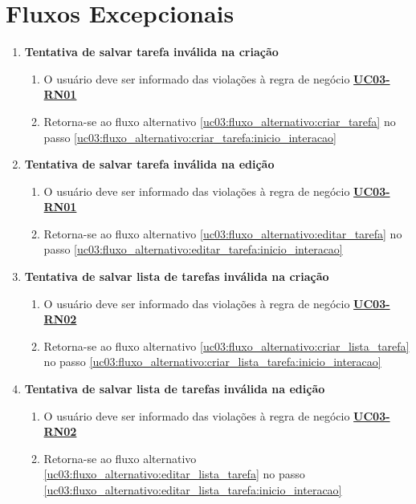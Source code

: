 \documentclass[
	12pt,				%
	oneside,			%
	a4paper,			%
	english,			%
	brazil,				%
	]{abntex2}
\begin{document}
\section{Fluxos Excepcionais}
\begin{enumerate}[label=\textbf{UC03-FE{\arabic*}},font=\normalsize]
    \item \textbf{\normalsize Tentativa de salvar tarefa inválida na criação} \label{uc03:fluxo_excepcional:tarefa_invalida_criar}
    \begin{enumerate}[label={\arabic*}.]
        \item O usuário deve ser informado das violações à regra de negócio \textbf{\hyperref[uc03:rn01_validar_tarefa]{UC03-RN01}} \label{ucxx:fluxo_excepcional:nome_fluxo_1:nome_passo1}
        \item Retorna-se ao fluxo alternativo \ref{uc03:fluxo_alternativo:criar_tarefa} no passo \ref{uc03:fluxo_alternativo:criar_tarefa:inicio_interacao}
    \end{enumerate}

    \item \textbf{\normalsize Tentativa de salvar tarefa inválida na edição} \label{uc03:fluxo_excepcional:tarefa_invalida_editar}
    \begin{enumerate}[label={\arabic*}.]
        \item O usuário deve ser informado das violações à regra de negócio \textbf{\hyperref[uc03:rn01_validar_tarefa]{UC03-RN01}}
        \item Retorna-se ao fluxo alternativo \ref{uc03:fluxo_alternativo:editar_tarefa} no passo \ref{uc03:fluxo_alternativo:editar_tarefa:inicio_interacao}
    \end{enumerate}

    \item \textbf{\normalsize Tentativa de salvar lista de tarefas inválida na criação} \label{uc03:fluxo_excepcional:lista_tarefa_invalida_criar}
    \begin{enumerate}[label={\arabic*}.]
        \item O usuário deve ser informado das violações à regra de negócio \textbf{\hyperref[uc03:rn02_validar_lista_tarefa]{UC03-RN02}}
        \item Retorna-se ao fluxo alternativo \ref{uc03:fluxo_alternativo:criar_lista_tarefa} no passo \ref{uc03:fluxo_alternativo:criar_lista_tarefa:inicio_interacao}
    \end{enumerate}

    \item \textbf{\normalsize Tentativa de salvar lista de tarefas inválida na edição} \label{uc03:fluxo_excepcional:lista_tarefa_invalida_editar}
    \begin{enumerate}[label={\arabic*}.]
        \item O usuário deve ser informado das violações à regra de negócio \textbf{\hyperref[uc03:rn02_validar_lista_tarefa]{UC03-RN02}}
        \item Retorna-se ao fluxo alternativo \ref{uc03:fluxo_alternativo:editar_lista_tarefa} no passo \ref{uc03:fluxo_alternativo:editar_lista_tarefa:inicio_interacao}
    \end{enumerate}
\end{enumerate}
\end{document}
